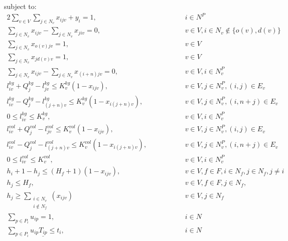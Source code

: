 \documentclass[a4paper,10pt]{article}
\begin{document}
subject to:
\begingroup
    \allowdisplaybreaks
\begin{alignat} {2}
    \sum_{v\in V}\sum_{j\in N_v}x_{ijv} + y_i = 1,	        	&\quad\quad\quad&& 	 i \in N^P 				\label{eq:2} 	\\[4pt]
    \sum_{j\in N_v}x_{ijv} - \sum_{j\in N_v}x_{jiv} = 0,		& 	&&	v \in V, i\in N_v \notin \{o(v), d(v)\}		\label{eq:3} 	\\[4pt]
    \sum_{j\in N_v}x_{o(v)jv} = 1,				        & 	&&	v \in V 					\label{eq:4}	\\[4pt]
    \sum_{j\in N_v}x_{j d(v)v} = 1,					& 	&&	v \in V 					\label{eq:5}	\\[4pt]
    \sum_{j\in N_v}x_{ijv} - \sum_{j\in N_v}x_{(i+n)jv} = 0,  	        & 	&&	v \in V, i\in N^P_v 				\label{eq:6}	\\[4pt]
    l_{iv}^{kg} + Q_j^{kg} - l_{jv}^{kg} \leq K_v^{kg}(1-x_{ijv}),      & 	&&	v \in V, j\in N_v^P, (i,j) \in E_v 		\label{eq:7} 	\\[8pt]
    l_{iv}^{kg} - Q_j^{kg} - l_{(j+n)v}^{kg} \leq K_v^{kg}(1-x_{i(j+n)v}),& 	&&	v \in V ,j\in N_v^P, (i, n+j)\in E_v 		\label{eq:8}	\\[8pt]
    0 \leq l_{iv}^{kg} \leq K_v^{kg},					& 	&&	v \in V, i \in N^P_v 				\label{eq:9}	\\[8pt]
    l_{iv}^{vol} + Q_j^{vol} - l_{jv}^{vol} \leq K_v^{vol}(1-x_{ijv}),      & 	&&	v \in V, j\in N_v^P, (i,j) \in E_v 		\label{eq:10} 	\\[8pt]
    l_{iv}^{vol} - Q_j^{vol} - l_{(j+n)v}^{vol} \leq K_v^{vol}(1-x_{i(j+n)v}),&	&&	v \in V ,j\in N_v^P, (i, n+j)\in E_v 		\label{eq:11}	\\[8pt]
    0 \leq l_{iv}^{vol} \leq K_v^{vol},					& 	&&	v \in V, i \in N^P_v 				\label{eq:12}	\\[8pt]
    h_{i} + 1 - h_{j} \leq (H_f+1)(1-x_{ijv}),				& 	&&	v \in V, f\in F,  i \in N_f, j \in N_f, j\neq i	\label{eq:13}	\\[4pt]
    h_{j} \leq H_f,                                                     & 	&&	v \in V,f\in F, j\in N_f,  			\label{eq:14}	\\[4pt]
    h_{j} \geq \sum_{\substack{i\in N_v\\i{\notin} N_f}}(x_{ijv})       & 	&&	v \in V, j \in N_f                      	\label{eq:15}	\\[4pt]
    \sum_{p\in P_i} u_{ip} = 1,						& 	&& 	i \in N 					\label{eq:16}	\\[4pt]
    \sum_{p\in P_i} u_{ip}\underline{T_{ip}} \leq t_{i},		& 	&&	i \in N 					\label{eq:17}	\\[4pt]

\end{alignat}
\end{document}
